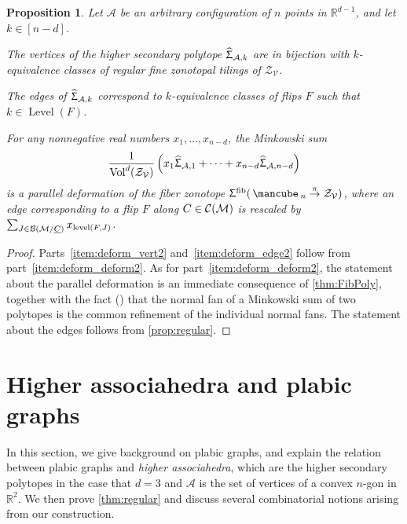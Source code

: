 \documentclass[11pt]{amsart}
\makeatletter
\newcommand{\itemrefperh@ps}[2]{\textup{#2}}
\newcommand{\itemref}[1]{\begingroup\let\perh@ps\itemrefperh@ps\ref{#1}\endgroup}
\theoremstyle{plain}
\newtheorem{proposition}[theorem]{Proposition}
\theoremstyle{definition}
\def\R{\mathbb{R}}
\def\A{\mathcal{A}}
\def\V{\mathcal{V}}
\def\Zon{\mathcal{Z}}
\def\ZV{\Zon_\V}
\def\cube{\mbox{\,\mancube\,}}
\def\Vol{\mathrm{Vol}}
\def\level{\mathrm{level}}
\def\Level{\operatorname{Level}}
\def\HSP{\widehat\Upsigma}
\def\Sigma{\HSP}
\def\fiber{{\operatorname{fib}}}
\def\FibPoly{\Upsigma^\fiber}
\def\pito{\overset \pi \to}
\def\Vold{\Vol^d}
\makeatother
\begin{document}
\begin{proposition}
Let $\A$ be an arbitrary configuration of $n$ points in $\R^{d-1}$, and let $k\in[n-d]$.
\begin{theoremlist}
\item\label{item:deform_vert2} The vertices of the higher secondary polytope $\Sigma_{\A,k}$ are in bijection with $k$-equivalence classes of regular fine zonotopal tilings of $\ZV$.
\item\label{item:deform_edge2} The edges of $\Sigma_{\A,k}$ correspond to $k$-equivalence classes of flips $F$ such that $k\in\Level(F)$.
\item\label{item:deform_deform2} For any nonnegative real numbers $x_1,\dots,x_{n-d}$, the Minkowski sum
  \[\frac1{\Vold(\ZV)} \left(x_1 \Sigma_{\A,1}+\dots + x_{n-d} \Sigma_{\A,n-d}\right)\]
is a parallel deformation of the fiber zonotope $\FibPoly(\cube_n\pito \ZV)$, where an edge corresponding to a flip $F$ along $C\in\mathcal{C}(\mathcal{M})$ is rescaled by $\sum_{J\in\BMC}x_{\level(F,J)}$.
\end{theoremlist}  
\end{proposition}
\begin{proof}
Parts~\itemref{item:deform_vert2} and~\itemref{item:deform_edge2} follow from part~\itemref{item:deform_deform2}.  As for 
part~\itemref{item:deform_deform2}, the statement about the parallel deformation
	is an immediate consequence of 
\cref{thm:FibPoly}, together with the fact (\cite[Proposition 7.12]{Ziegler}) that the normal fan of a Minkowski sum of two polytopes 
	is the common refinement of 
	the individual normal fans.  
The statement about the edges follows from 
	\cref{prop:regular}.
\end{proof}


\def\face{F}

\def\Bpt{Black-partite\xspace}
\def\Wpt{White-partite\xspace}
\def\bpt{black-partite\xspace}
\def\wpt{white-partite\xspace}

\def\bptop{{\operatorname{bpt}}}
\def\wptop{{\operatorname{wpt}}}

\def\Gbpt{G^\bptop}
\def\Gwpt{G^\wptop}

\section{Higher associahedra and plabic graphs}\label{sec:higherassoc}

In this section, we give background on plabic graphs, and explain the relation
between plabic graphs and \emph{higher associahedra}, which are the higher secondary polytopes in the case that $d=3$ and $\A$ is the set of vertices of a convex $n$-gon in $\R^2$. We then prove 
\cref{thm:regular} and discuss several combinatorial notions arising from our construction.
\end{document}
